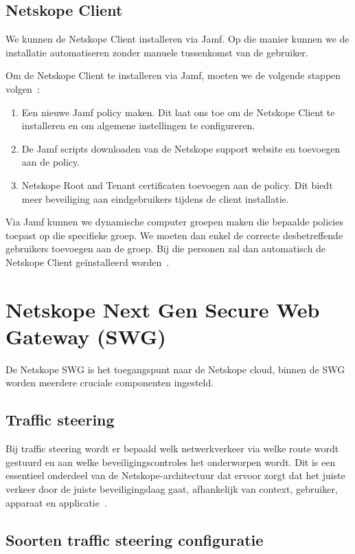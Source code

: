 \subsection{Netskope Client}
We kunnen de Netskope Client installeren via Jamf. Op die manier kunnen we de installatie automatiseren zonder manuele tussenkomst van de gebruiker.

\vspace{2ex}

Om de Netskope Client te installeren via Jamf, moeten we de volgende stappen volgen~\autocite{Netskope2025-9}:

\begin{enumerate}
    \item Een nieuwe Jamf policy maken. Dit laat ons toe om de Netskope Client te installeren en om algemene instellingen te configureren.
    \item De Jamf scripts downloaden van de Netskope support website en toevoegen aan de policy.
    \item Netskope Root and Tenant certificaten toevoegen aan de policy. Dit biedt meer beveiliging aan eindgebruikers tijdens de client installatie.
\end{enumerate}

Via Jamf kunnen we dynamische computer groepen maken die bepaalde policies toepast op die specifieke groep. We moeten dan enkel de correcte desbetreffende gebruikers toevoegen aan de groep. Bij die personen zal dan automatisch de Netskope Client geïnstalleerd worden~\autocite{Jamf2025}.

\section{Netskope Next Gen Secure Web Gateway (SWG)}
De Netskope SWG is het toegangspunt naar de Netskope cloud, binnen de SWG worden meerdere cruciale componenten ingesteld.

\subsection{Traffic steering}
Bij traffic steering wordt er bepaald welk netwerkverkeer via welke route wordt gestuurd en aan welke beveiligingscontroles het onderworpen wordt. Dit is een essentieel onderdeel van de Netskope-architectuur dat ervoor zorgt dat het juiste verkeer door de juiste beveiligingslaag gaat, afhankelijk van context, gebruiker, apparaat en applicatie~\autocite{Netskope2025-3}.

\subsection{Soorten traffic steering configuratie}


